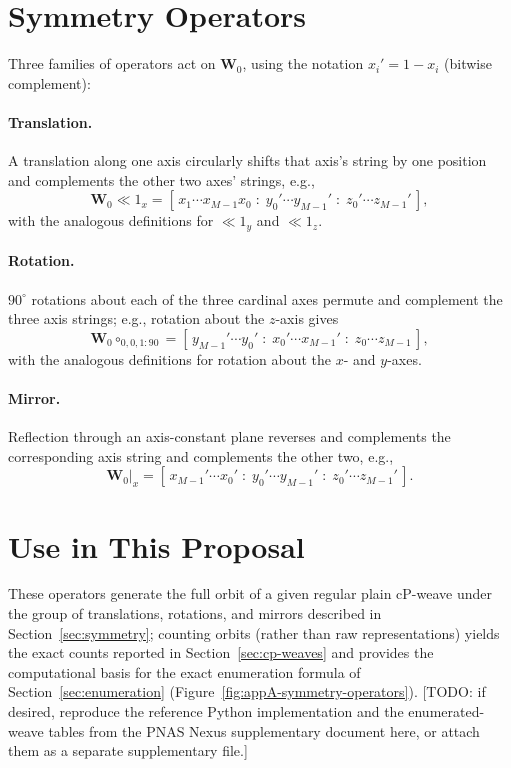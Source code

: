 \section{Symmetry Operators}

Three families of operators act on $\mathbf{W}_0$, using the notation $x_i' = 1 - x_i$ (bitwise complement):

\paragraph{Translation.} A translation along one axis circularly shifts that axis's string by one position and complements the other two axes' strings, e.g.,
\[
\mathbf{W}_0 \ll 1_x = [\,x_1 \cdots x_{M-1} x_0 \;:\; y_0' \cdots y_{M-1}' \;:\; z_0' \cdots z_{M-1}'\,],
\]
with the analogous definitions for $\ll 1_y$ and $\ll 1_z$.

\paragraph{Rotation.} $90^\circ$ rotations about each of the three cardinal axes permute and complement the three axis strings; e.g., rotation about the $z$-axis gives
\[
\mathbf{W}_0 \circ_{0,0,1:90} = [\,y_{M-1}' \cdots y_0' \;:\; x_0' \cdots x_{M-1}' \;:\; z_0 \cdots z_{M-1}\,],
\]
with the analogous definitions for rotation about the $x$- and $y$-axes.

\paragraph{Mirror.} Reflection through an axis-constant plane reverses and complements the corresponding axis string and complements the other two, e.g.,
\[
\mathbf{W}_0\big|_x = [\,x_{M-1}' \cdots x_0' \;:\; y_0' \cdots y_{M-1}' \;:\; z_0' \cdots z_{M-1}'\,].
\]

\section{Use in This Proposal}

These operators generate the full orbit of a given regular plain cP-weave under the group of translations, rotations, and mirrors described in Section~\ref{sec:symmetry}; counting orbits (rather than raw representations) yields the exact counts reported in Section~\ref{sec:cp-weaves} and provides the computational basis for the exact enumeration formula of Section~\ref{sec:enumeration} (Figure~\ref{fig:appA-symmetry-operators}). [TODO: if desired, reproduce the reference Python implementation and the enumerated-weave tables from the PNAS Nexus supplementary document here, or attach them as a separate supplementary file.]


